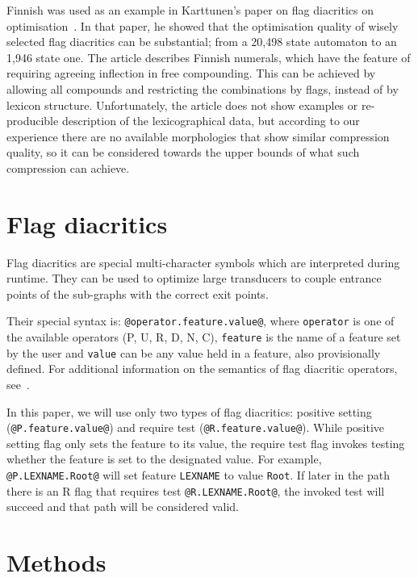 \documentclass[10pt, a4paper]{article}
\begin{document}
Finnish was used as an example in Karttunen's paper on flag diacritics
on optimisation~. In that paper, he
showed that the optimisation quality of wisely selected flag
diacritics can be substantial; from a 20,498 state automaton to an
1,946 state one. The article describes Finnish numerals, which have
the feature of requiring agreeing inflection in free compounding. This
can be achieved by allowing all compounds and restricting the
combinations by flags, instead of by lexicon structure. Unfortunately,
the article does not show examples or re-producible description of the
lexicographical data, but according to our experience there are no available
morphologies that show similar compression quality, so it can be
considered towards the upper bounds of what such compression can
achieve.
 
\section{Flag diacritics}
\label{sec:flags}

Flag diacritics are special multi-character symbols which are interpreted during runtime. They can be used to optimize large transducers to couple entrance points of the sub-graphs with the correct exit points.

Their special syntax is: \verb+@operator.feature.value@+, where
\texttt{operator} is one of the available operators (P, U, R, D, N, C), \texttt{feature} is the name of a feature set by the user and \texttt{value} can be any value held in a feature, also provisionally defined. For additional information on the semantics of flag diacritic operators, see~.


In this paper, we will use only two types of flag diacritics: positive
setting (\verb+@P.feature.value@+) and require test
(\verb+@R.feature.value@+). While positive setting flag only sets the
feature to its value, the require test flag invokes testing whether the
feature is set to the designated value. For example,
\verb+@P.LEXNAME.Root@+ will set feature \texttt{LEXNAME} to value
\texttt{Root}. If later in the path there is an R flag that requires test
\verb+@R.LEXNAME.Root@+, the invoked test will succeed and that path
will be considered valid.



\section{Methods}
\label{sec:methods}
\end{document}
